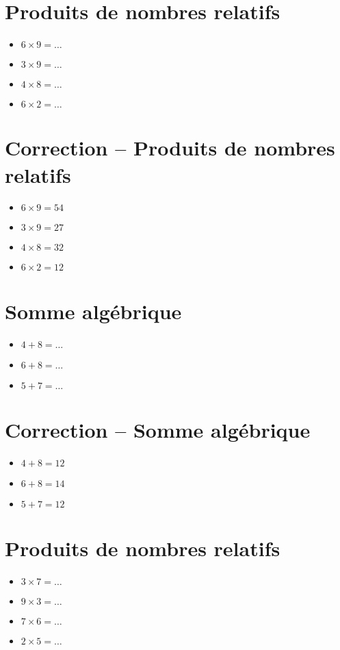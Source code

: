 \documentclass[a4paper,11pt,fleqn]{article}
\begin{document}
\section{Produits de nombres relatifs}
\begin{itemize}

  \item $6\times9=\ldots$
  \item $3\times9=\ldots$
  \item $4\times8=\ldots$
  \item $6\times2=\ldots$
\end{itemize}

\section{Correction -- Produits de nombres relatifs}
\begin{itemize}

  \item $6\times9=54$
  \item $3\times9=27$
  \item $4\times8=32$
  \item $6\times2=12$
\end{itemize}
\newpage
\setcounter{exo}{0}
\setcounter{section}{0}
\section{Somme algébrique}
\begin{itemize}

3
3
3
3
3
3
3
3
3
3
  \item $4+8=\ldots$
  \item $6+8=\ldots$
  \item $5+7=\ldots$
\end{itemize}

\section{Correction -- Somme algébrique}
\begin{itemize}

  \item $4+8=12$
  \item $6+8=14$
  \item $5+7=12$
\end{itemize}

\section{Produits de nombres relatifs}
\begin{itemize}

  \item $3\times7=\ldots$
  \item $9\times3=\ldots$
  \item $7\times6=\ldots$
  \item $2\times5=\ldots$
\end{itemize}
\end{document}
